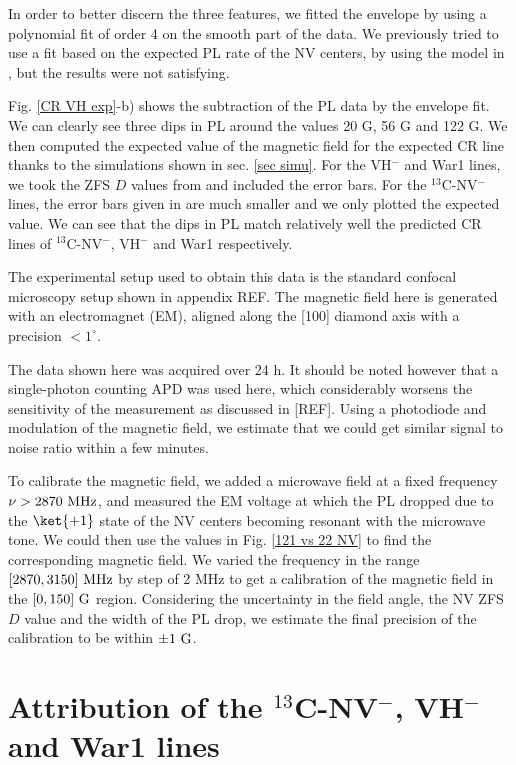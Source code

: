 \documentclass[a4paper,11pt]{report}
\begin{document}
\begin{refsection}
In order to better discern the three features, we fitted the envelope by using a polynomial fit of order 4 on the smooth part of the data. We previously tried to use a fit based on the expected PL rate of the NV centers, by using the model in \citep{tetienne2012magnetic}, but the results were not satisfying.

Fig. \ref{CR VH exp}-b) shows the subtraction of the PL data by the envelope fit. We can clearly see three dips in PL around the values 20 G, 56 G and 122 G. We then computed the expected value of the magnetic field for the expected CR line thanks to the simulations shown in sec. \ref{sec simu}. For the VH$^-$ and War1 lines, we took the ZFS $D$ values from \citep{cruddace2007magnetic} and included the error bars. For the $^{13}$C-NV$^-$ lines, the error bars given in \citep{simanovskaia2013sidebands} are much smaller and we only plotted the expected value. We can see that the dips in PL match relatively well the predicted CR lines of $^{13}$C-NV$^-$, VH$^-$ and War1 respectively.

The experimental setup used to obtain this data is the standard confocal microscopy setup shown in appendix REF. The magnetic field here is generated with an electromagnet (EM), aligned along the [100] diamond axis with a precision $<1^\circ$. 

The data shown here was acquired over 24 h. It should be noted however that a single-photon counting APD was used here, which considerably worsens the sensitivity of the measurement as discussed in [REF]. Using a photodiode and modulation of the magnetic field, we estimate that we could get similar signal to noise ratio within a few minutes.

To calibrate the magnetic field, we added a microwave field at a  fixed frequency $\nu > 2870\ \rm MHz$, and measured the EM voltage at which the PL dropped due to the $\ket{+1}$ state of the NV centers becoming resonant with the microwave tone. We could then use the values in Fig. \ref{121 vs 22 NV} to find the corresponding magnetic field. We varied the frequency in the range  $[2870,3150]\ \rm MHz$ by step of 2 MHz to get a calibration of the magnetic field in the $[0,150]\ \rm G$ region. Considering the uncertainty in the field angle, the NV ZFS $D$ value and the width of the PL drop, we estimate the final precision of the calibration to be within $\pm 1\ \rm G$.

\section{Attribution of the $^{13}$C-NV$^-$, VH$^-$ and War1 lines}


\end{refsection}
\end{document}
